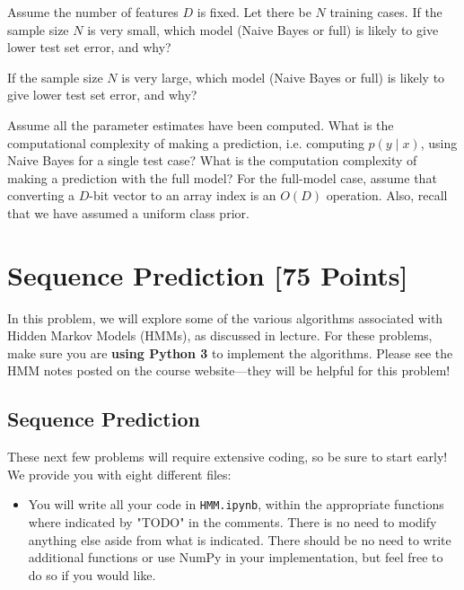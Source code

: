 \begin{solution}
\end{solution}

\problem[2] Assume the number of features $D$ is fixed. Let there be $N$ training cases. If the sample size $N$ is very small, which model (Naive Bayes or full) is likely to give lower test set error, and why?

\begin{solution}
\end{solution}

\problem[2] If the sample size $N$ is very large, which model (Naive Bayes or full) is likely to give lower test set error, and why?
\begin{solution}
\end{solution}

\problem[11] Assume all the parameter estimates have been computed. What is the computational complexity of making a prediction, i.e. computing $p(y \mid x)$, using Naive Bayes for a single test case? What is the computation complexity of making a prediction with the full model? For the full-model case, assume that converting a $D$-bit vector to an array index is an $O(D)$ operation.  Also, recall that we have assumed a uniform class prior. 

\begin{solution}
\end{solution}


\newpage
\section{Sequence Prediction [75 Points]}

In this problem, we will explore some of the various algorithms associated with Hidden Markov Models (HMMs), as discussed in lecture.  For these problems, make sure you are \textbf{using Python 3} to implement the algorithms. Please see the HMM notes posted on the course website---they will be helpful for this problem!

\subsection{Sequence Prediction}

These next few problems will require extensive coding, so be sure to start early! We provide you with eight different files:
\begin{itemize}
  \item You will write all your code in \texttt{HMM.ipynb}, within the appropriate functions where indicated by "TODO" in the comments. There is no need to modify anything else aside from what is indicated. There should be no need to write additional functions or use NumPy in your implementation, but feel free to do so if you would like. 
\end{itemize}

